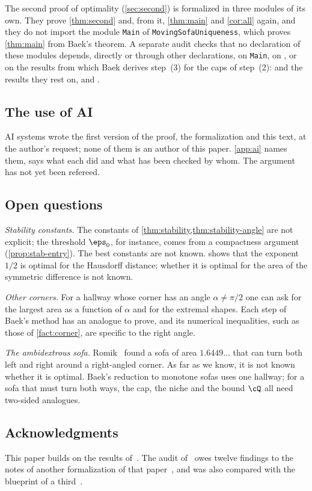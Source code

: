 The second proof of optimality (\cref{sec:second}) is formalized in three
modules of its own. They prove \cref{thm:second} and, from it, \cref{thm:main}
and \cref{cor:all} again, and they do not import the module \texttt{Main} of
\texttt{MovingSofaUniqueness}, which proves \cref{thm:main} from Baek's theorem.
A separate audit checks that no declaration of these modules depends, directly
or through other declarations, on \texttt{Main}, on , or on the
results from which Baek derives step~(3) for the caps of step~(2):
 and the results they rest on,
 and
.

\subsection{The use of AI}

AI systems wrote the first version of the proof, the formalization and this
text, at the author's request; none of them is an author of this paper.
\cref{app:ai} names them, says what each did and what has been checked by whom.
The argument has not yet been refereed.

\subsection{Open questions}

\emph{Stability constants.} The constants of
\cref{thm:stability,thm:stability-angle} are not explicit; the threshold
$\eps_0$, for instance, comes from a compactness argument
(\cref{prop:stab-entry}). The best constants are not known.
 shows that the exponent $1/2$ is optimal for the
Hausdorff distance; whether it is optimal for the area of the symmetric
difference is not known.

\emph{Other corners.} For a hallway whose corner has an angle $\alpha\ne\pi/2$
one can ask for the largest area as a function of $\alpha$ and for the extremal
shapes. Each step of Baek's method has an analogue to prove, and its numerical
inequalities, such as those of \cref{fact:corner}, are specific to the right
angle.

\emph{The ambidextrous sofa.} Romik~\cite{Romik18} found a sofa of area
$1.6449\ldots$ that can turn both left and right around a right-angled corner.
As far as we know, it is not known whether it is optimal. Baek's reduction to
monotone sofas uses one hallway; for a sofa that must turn both ways, the cap,
the niche and the bound $\cQ$ all need two-sided analogues.

\subsection*{Acknowledgments}
This paper builds on the results of~\cite{Baek}. The audit of~\cite{Baek} owes
twelve findings to the notes of another formalization of that
paper~\cite{Cureton}, and was also compared with the blueprint of a
third~\cite{Cao}.
